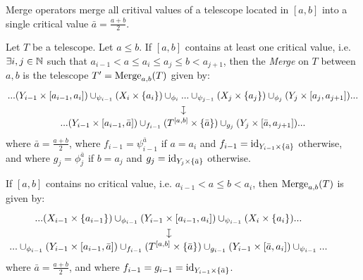 Merge operators merge all critival values of a telescope located in $[a,b]$ into
a single critical value $\bar a=\frac{a+b}{2}$.  
%
\begin{defin}[Merge]
Let $T$ be a telescope.
Let $a\leq b$.  If $[a,b]$ contains at least one critical value,
i.e. $\exists i,j\in\mathbb{N}$ such that $a_{i-1}<a\leq a_i\leq a_j\leq b < a_{j+1}$, then the {\em Merge} on
$T$ between $a,b$ is the telescope $T'=\mathrm{Merge}_{a,b}(T)$ given by:
%
\[\arraycolsep=1.4pt\def\arraystretch{1.2}
\begin{array}{c}
...(Y_{i-1}\times[a_{i-1},a_i])\cup_{\psi_{i-1}}(X_i\times\{a_i\})\cup_{\phi_i}...\cup_{\psi_{j-1}}(X_j\times\{a_j\})\cup_{\phi_j}(Y_j\times[a_j,a_{j+1}])...\\
\rotatebox[origin=c]{270}{$\mapsto$}\\
...(Y_{i-1}\times[a_{i-1},\bar{a}])\cup_{f_{i-1}}(T^{[a,b]}\times\{\bar{a}\})\cup_{g_j}(Y_j\times[\bar{a},a_{j+1}])...
\end{array}
\]
%
where $\bar{a}=\frac{a+b}{2}$, where
$f_{i-1}=\psi_{i-1}^{\bar{a}}$ if $a=a_i$ and
$f_{i-1}={\rm id}_{Y_{i-1}\times\{\bar{a}\}}$
otherwise, and where $g_j=\phi_j^{\bar{a}}$ if $b=a_j$ and
$g_{j}={\rm id}_{Y_j\times\{\bar{a}\}}$
otherwise.

%
If $[a,b]$ contains no critical value, i.e. $a_{i-1}<a\leq
b<a_i$, then $\mathrm{Merge}_{a,b}(T)$ is given by:
%
\[\hspace{-30pt}\arraycolsep=1.4pt\def\arraystretch{1.2}
\begin{array}{c}
...(X_{i-1}\times\{a_{i-1}\})\cup_{\phi_{i-1}}(Y_{i-1}\times[a_{i-1},a_i])\cup_{\psi_{i-1}}(X_i\times\{a_i\})...\\
\rotatebox[origin=c]{270}{$\mapsto$}\\
...
\cup_{\phi_{i-1}}
(Y_{i-1}\times[a_{i-1},\bar{a}])\cup_{f_{i-1}}(T^{[a,b]}\times\{\bar{a}\})\cup_{g_{i-1}}(Y_{i-1}\times[\bar{a},a_i])
\cup_{\psi_{i-1}}
...
\end{array}
\]
where $\bar{a}=\frac{a+b}{2}$, and where
$f_{i-1}=g_{i-1}={\rm id}_{Y_{i-1}\times\{\bar{a}\}}$.
\end{defin}
%
